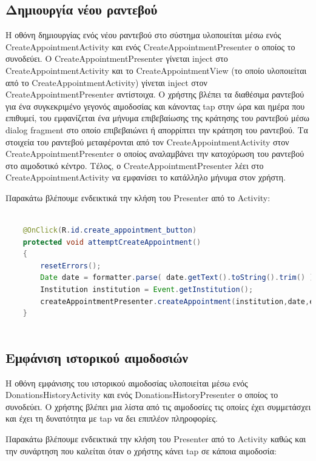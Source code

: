 	
\subsection{Δημιουργία νέου ραντεβού}	

	
   		Η οθόνη δημιουργίας ενός νέου ραντεβού στο σύστημα υλοποιείται μέσω ενός CreateAppointmentActivity και ενός CreateAppointmentPresenter ο οποίος το συνοδεύει. Ο CreateAppointmentPresenter γίνεται inject στο CreateAppointmentActivity και το CreateAppointmentView (το οποίο υλοποιείται από το CreateAppointmentActivity) γίνεται inject στον CreateAppointmentPresenter αντίστοιχα. O χρήστης βλέπει τα διαθέσιμα ραντεβού για ένα συγκεκριμένο γεγονός αιμοδοσίας και κάνοντας tap στην ώρα και ημέρα που επιθυμεί, του εμφανίζεται ένα μήνυμα επιβεβαίωσης της κράτησης του ραντεβού μέσω dialog fragment στο οποίο επιβεβαιώνει ή απορρίπτει την κράτηση του ραντεβού. Τα στοιχεία του ραντεβού μεταφέρονται από τον CreateAppointmentActivity στον CreateAppointmentPresenter ο οποίος αναλαμβάνει την κατοχύρωση του ραντεβού στο αιμοδοτικό κέντρο. Τέλος, ο CreateAppointmentPresenter λέει στο CreateAppointmentActivity να εμφανίσει το κατάλληλο μήνυμα στον χρήστη.
   
   		
   		Παρακάτω βλέπουμε ενδεικτικά την κλήση του Presenter από το Activity:
   			
   			
   	\begin{lstlisting}[language=Java]			
		
    @OnClick(R.id.create_appointment_button)
    protected void attemptCreateAppointment()
    {
        resetErrors();
        Date date = formatter.parse( date.getText().toString().trim() );
        Institution institution = Event.getInstitution();
        createAppointmentPresenter.createAppointment(institution,date,event);
    }
    
		\end{lstlisting}
		
\subsection{Εμφάνιση ιστορικού αιμοδοσιών}	

   		Η οθόνη εμφάνισης του ιστορικού αιμοδοσίας υλοποιείται μέσω ενός DonationsHistoryActivity και ενός DonationsHistoryPresenter ο οποίος το συνοδεύει. O χρήστης βλέπει μια λίστα από τις αιμοδοσίες τις οποίες έχει συμμετάσχει και έχει τη δυνατότητα με tap να δει επιπλέον πληροφορίες. 
   
   		Παρακάτω βλέπουμε ενδεικτικά την κλήση του Presenter από το Activity καθώς και την συνάρτηση που καλείται όταν ο χρήστης κάνει tap σε κάποια αιμοδοσία:
   			
